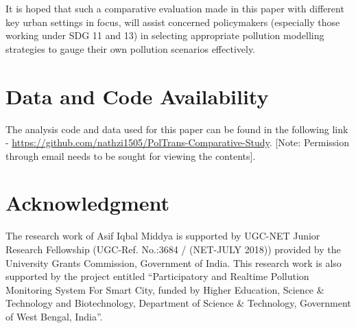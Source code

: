 \documentclass[10pt,journal]{IEEEtran}
\begin{document}
It is hoped that such a comparative evaluation made in this paper with different key urban settings in focus, will assist concerned policymakers (especially those working under SDG 11 and 13) in selecting appropriate pollution modelling strategies to gauge their own pollution scenarios effectively. 

\section*{Data and Code Availability}
The analysis code and data used for this paper can be found in the following link - \url{https://github.com/nathzi1505/PolTrans-Comparative-Study}. [Note: Permission through email needs to be sought for viewing the contents].

\section*{Acknowledgment}
The research work of Asif Iqbal Middya is supported by UGC-NET Junior Research Fellowship (UGC-Ref. No.:3684 / (NET-JULY 2018)) provided by the University Grants Commission, Government of India. This research work is also supported by the project entitled ``Participatory and Realtime Pollution Monitoring System For Smart City, funded by Higher Education, Science \& Technology and Biotechnology, Department of Science \& Technology, Government of West Bengal, India''.  

\ifCLASSOPTIONcaptionsoff
  \newpage
\fi



\end{document}
